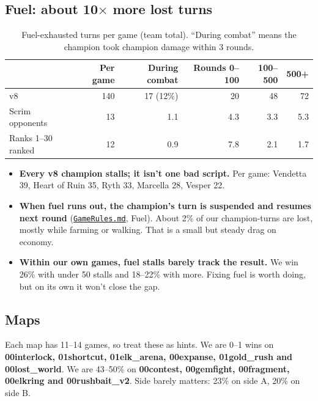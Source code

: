 \documentclass[11pt,a4paper]{article}
\newcommand{\repo}{file:///Users/tristanbasri/Desktop/Code/cambridge-battlecode-s2}
\newcommand{\code}[2]{\href{\repo/#1}{\texttt{\textcolor{cOurs!80!black}{#2}}}}
\begin{document}
\subsection{Fuel: about 10\texorpdfstring{$\times$}{x} more lost turns}

\begin{table}[H]
\centering\small
\begin{tabular}{lrrrrr}
\toprule
 & Per game & During combat & Rounds 0--100 & 100--500 & 500+ \\
\midrule
v8                & 140 & 17 (12\%) & 20  & 48  & 72 \\
Scrim opponents   & 13  & 1.1       & 4.3 & 3.3 & 5.3 \\
Ranks 1--30 ranked & 12 & 0.9       & 7.8 & 2.1 & 1.7 \\
\bottomrule
\end{tabular}
\caption{Fuel-exhausted turns per game (team total). ``During combat'' means the champion took champion damage within 3 rounds.}
\end{table}

\begin{itemize}
  \item \textbf{Every v8 champion stalls; it isn't one bad script.} Per game: Vendetta 39, Heart of Ruin 35, Ryth 33, Marcella 28, Vesper 22.
  \item \textbf{When fuel runs out, the champion's turn is suspended and resumes next round} (\code{docs/GameRules.md}{GameRules.md}, Fuel). About 2\% of our champion-turns are lost, mostly while farming or walking. That is a small but steady drag on economy.
  \item \textbf{Within our own games, fuel stalls barely track the result.} We win 26\% with under 50 stalls and 18--22\% with more. Fixing fuel is worth doing, but on its own it won't close the gap.
\end{itemize}

\subsection{Maps}

Each map has 11--14 games, so treat these as hints. We are 0--1 wins on \textbf{00interlock, 01shortcut, 01elk\_arena, 00expanse, 01gold\_rush and 00lost\_world}. We are 43--50\% on \textbf{00contest, 00gemfight, 00fragment, 00elkring and 00rushbait\_v2}. Side barely matters: 23\% on side A, 20\% on side B.

\end{document}
